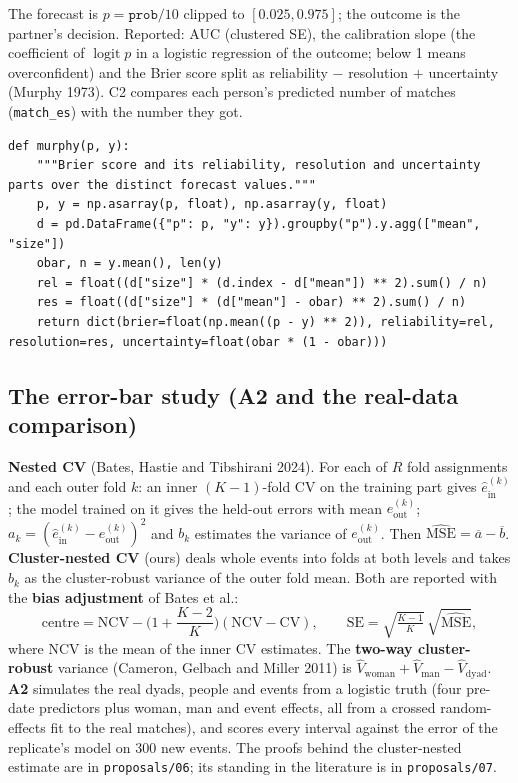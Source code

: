 \documentclass[11pt]{article}
\begin{document}
The forecast is $p = \texttt{prob}/10$ clipped to $[0.025, 0.975]$; the outcome is the partner's decision. Reported:
AUC (clustered SE), the calibration slope (the coefficient of $\operatorname{logit} p$ in a logistic regression of the
outcome; below 1 means overconfident) and the Brier score split as reliability $-$ resolution $+$ uncertainty (Murphy
1973). C2 compares each person's predicted number of matches (\texttt{match\_es}) with the number they got.

\begin{lstlisting}[caption={Brier score decomposition (scripts/forecasts.py)}]
def murphy(p, y):
    """Brier score and its reliability, resolution and uncertainty parts over the distinct forecast values."""
    p, y = np.asarray(p, float), np.asarray(y, float)
    d = pd.DataFrame({"p": p, "y": y}).groupby("p").y.agg(["mean", "size"])
    obar, n = y.mean(), len(y)
    rel = float((d["size"] * (d.index - d["mean"]) ** 2).sum() / n)
    res = float((d["size"] * (d["mean"] - obar) ** 2).sum() / n)
    return dict(brier=float(np.mean((p - y) ** 2)), reliability=rel, resolution=res, uncertainty=float(obar * (1 - obar)))
\end{lstlisting}

\subsection{The error-bar study (A2 and the real-data comparison)}\label{sec:errorbars}

\textbf{Nested CV} (Bates, Hastie and Tibshirani 2024). For each of $R$ fold assignments and each outer fold $k$:
an inner $(K-1)$-fold CV on the training part gives $\hat e^{(k)}_{\text{in}}$; the model trained on it gives the
held-out errors with mean $e^{(k)}_{\text{out}}$; $a_k = (\hat e^{(k)}_{\text{in}} - e^{(k)}_{\text{out}})^2$ and $b_k$ estimates
the variance of $e^{(k)}_{\text{out}}$. Then $\widehat{\text{MSE}} = \overline{a} - \overline{b}$. \textbf{Cluster-nested CV}
(ours) deals whole events into folds at both levels and takes $b_k$ as the cluster-robust variance of the outer fold
mean. Both are reported with the \textbf{bias adjustment} of Bates et al.:
\[
\text{centre} = \text{NCV} - \Big(1 + \frac{K-2}{K}\Big)(\text{NCV} - \text{CV}), \qquad
\text{SE} = \sqrt{\tfrac{K-1}{K}}\,\sqrt{\widehat{\text{MSE}}},
\]
where NCV is the mean of the inner CV estimates. The \textbf{two-way cluster-robust} variance (Cameron, Gelbach and Miller
2011) is $\hat V_{\text{woman}} + \hat V_{\text{man}} - \hat V_{\text{dyad}}$. \textbf{A2} simulates the real dyads, people and
events from a logistic truth (four pre-date predictors plus woman, man and event effects, all from a crossed
random-effects fit to the real matches), and scores every interval against the error of the replicate's model on
300 new events. The proofs behind the cluster-nested estimate are in \texttt{proposals/06}; its standing in the
literature is in \texttt{proposals/07}.
\end{document}
